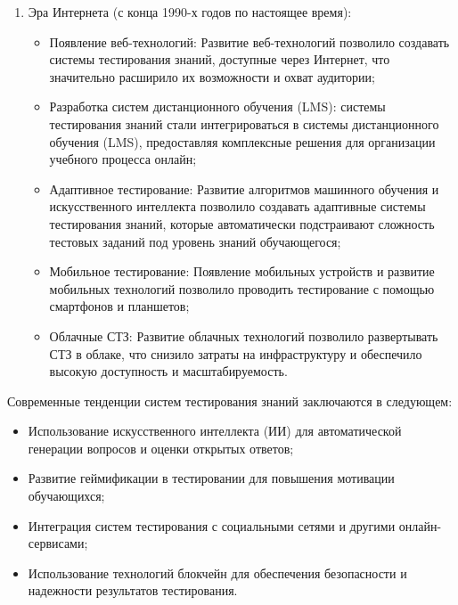 \begin{enumerate}
	\item Эра Интернета (с конца 1990-х годов по настоящее время):
	\begin{itemize}
		\item Появление веб-технологий: Развитие веб-технологий позволило создавать системы тестирования знаний, доступные через Интернет, что значительно расширило их возможности и охват аудитории;
		\item Разработка систем дистанционного обучения (LMS): системы тестирования знаний стали интегрироваться в системы дистанционного обучения (LMS), предоставляя комплексные решения для организации учебного процесса онлайн;
		\item Адаптивное тестирование: Развитие алгоритмов машинного обучения и искусственного интеллекта позволило создавать адаптивные системы тестирования знаний, которые автоматически подстраивают сложность тестовых заданий под уровень знаний обучающегося;
		\item Мобильное тестирование: Появление мобильных устройств и развитие мобильных технологий позволило проводить тестирование с помощью смартфонов и планшетов;
		\item Облачные СТЗ: Развитие облачных технологий позволило развертывать СТЗ в облаке, что снизило затраты на инфраструктуру и обеспечило высокую доступность и масштабируемость.
	\end{itemize}
\end{enumerate}

Современные тенденции систем тестирования знаний заключаются в следующем:
	\begin{itemize}
	\item Использование искусственного интеллекта (ИИ) для автоматической генерации вопросов и оценки открытых ответов;
	\item Развитие геймификации в тестировании для повышения мотивации обучающихся;
	\item Интеграция систем тестирования с социальными сетями и другими онлайн-сервисами;
	\item Использование технологий блокчейн для обеспечения безопасности и надежности результатов тестирования.
\end{itemize} 